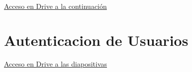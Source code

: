 \documentclass[12pt, twoside, openright]{report} %
\begin{document}
\href{https://drive.google.com/file/d/1HCPXUgQZdJhzb-RSoEQ4a3lpcr0BL7Wh}{Acceso en Drive a la continuación}

\section{Autenticacion de Usuarios}
\href{https://drive.google.com/file/d/1LeW4zDzfHuWrtOJt_1oKhUiT8p8w9eY0}{Acceso en Drive a las diapositivas}
\end{document}
